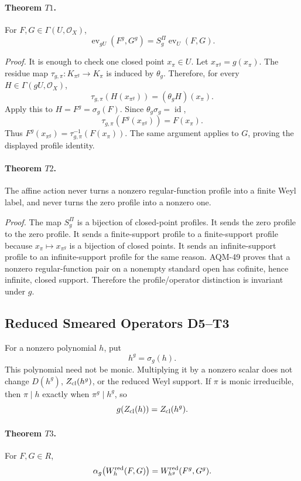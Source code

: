 \paragraph{Theorem \(T1\).}
For \(F,G\in\Gamma(U,\mathcal O_X)\),
\[
  \operatorname{ev}_{gU}(F^g,G^g)=
  S_g^\Pi\operatorname{ev}_U(F,G).
\]

\emph{Proof.}
It is enough to check one closed point \(x_\pi\in U\).  Let
\(x_{\pi^g}=g(x_\pi)\).  The residue map
\(\tau_{g,\pi}:K_{\pi^g}\to K_\pi\) is induced by \(\theta_g\).  Therefore,
for every \(H\in\Gamma(gU,\mathcal O_X)\),
\[
  \tau_{g,\pi}(H(x_{\pi^g}))=(\theta_gH)(x_\pi).
\]
Apply this to \(H=F^g=\sigma_g(F)\).  Since \(\theta_g\sigma_g=\operatorname{id}\),
\[
  \tau_{g,\pi}(F^g(x_{\pi^g}))=F(x_\pi).
\]
Thus \(F^g(x_{\pi^g})=\tau_{g,\pi}^{-1}(F(x_\pi))\).  The same argument applies
to \(G\), proving the displayed profile identity.

\paragraph{Theorem \(T2\).}
The affine action never turns a nonzero regular-function profile into a
finite Weyl label, and never turns the zero profile into a nonzero one.

\emph{Proof.}
The map \(S_g^\Pi\) is a bijection of closed-point profiles.  It sends the zero
profile to the zero profile.  It sends a finite-support profile to a
finite-support profile because \(x_\pi\mapsto x_{\pi^g}\) is a bijection of
closed points.  It sends an infinite-support profile to an infinite-support
profile for the same reason.  AQM-49 proves that a nonzero regular-function
pair on a nonempty standard open has cofinite, hence infinite, closed support.
Therefore the profile/operator distinction is invariant under \(g\).

\subsection{Reduced Smeared Operators D5--T3}
For a nonzero polynomial \(h\), put
\[
  h^g=\sigma_g(h).
\]
This polynomial need not be monic.  Multiplying it by a nonzero scalar does
not change \(D(h^g)\), \(Z_{\rm cl}(h^g)\), or the reduced Weyl support.  If
\(\pi\) is monic irreducible, then \(\pi\mid h\) exactly when
\(\pi^g\mid h^g\), so
\[
  g(Z_{\rm cl}(h))=Z_{\rm cl}(h^g).
\]

\paragraph{Theorem \(T3\).}
For \(F,G\in R\),
\[
  \alpha_g\!\left(W_h^{\rm red}(F,G)\right)
  =
  W_{h^g}^{\rm red}(F^g,G^g).
\]

